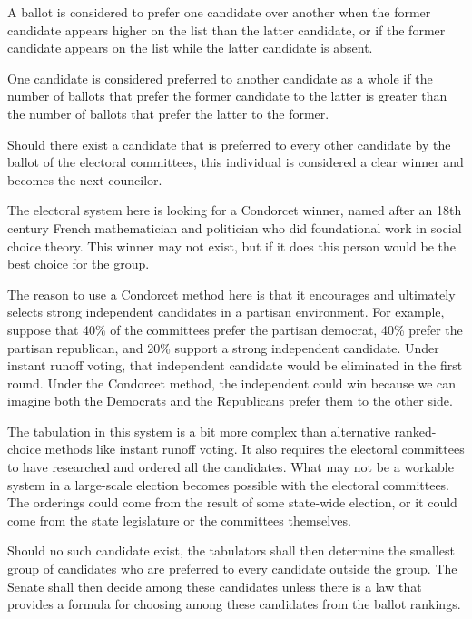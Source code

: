 \documentclass{article}
\begin{document}
\begin{quoting}
A ballot is considered to prefer one candidate over another when the former candidate appears higher on the list than the latter candidate, or if the former candidate appears on the list while the latter candidate is absent.

One candidate is considered preferred to another candidate as a whole if the number of ballots that prefer the former candidate to the latter is greater than the number of ballots that prefer the latter to the former.

Should there exist a candidate that is preferred to every other candidate by the ballot of the electoral committees, this individual is considered a clear winner and becomes the next councilor.
\end{quoting}

The electoral system here is looking for a Condorcet winner, named after an 18th century French mathematician and politician who did foundational work in social choice theory. This winner may not exist, but if it does this person would be the best choice for the group.

The reason to use a Condorcet method here is that it encourages and ultimately selects strong independent candidates in a partisan environment. For example, suppose that 40\% of the committees prefer the partisan democrat, 40\% prefer the partisan republican, and 20\% support a strong independent candidate. Under instant runoff voting, that independent candidate would be eliminated in the first round. Under the Condorcet method, the independent could win because we can imagine both the Democrats and the Republicans prefer them to the other side.

The tabulation in this system is a bit more complex than alternative ranked-choice methods like instant runoff voting. It also requires the electoral committees to have researched and ordered all the candidates. What may not be a workable system in a large-scale election becomes possible with the electoral committees. The orderings could come from the result of some state-wide election, or it could come from the state legislature or the committees themselves.

\begin{quoting}
Should no such candidate exist, the tabulators shall then determine the smallest group of candidates who are preferred to every candidate outside the group. The Senate shall then decide among these candidates unless there is a law that provides a formula for choosing among these candidates from the ballot rankings.
\end{quoting}
\end{document}
